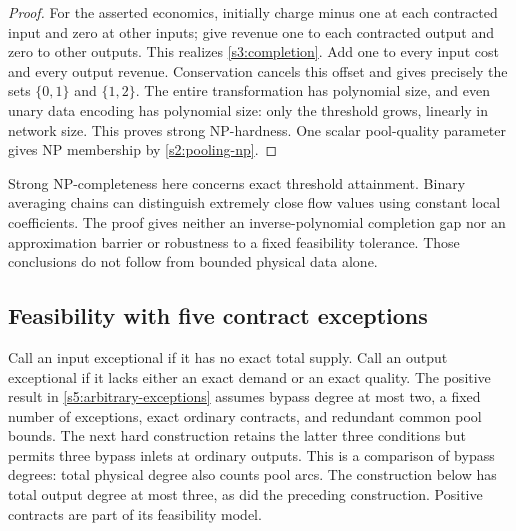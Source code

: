\begin{proof}
For the asserted economics, initially charge minus one at each contracted
input and zero at other inputs; give revenue one to each contracted
output and zero to other outputs. This realizes \eqref{s3:completion}.
Add one to every input cost and every output revenue. Conservation
cancels this offset and gives precisely the sets $\{0,1\}$ and
$\{1,2\}$. The entire transformation has polynomial size, and even
unary data encoding has polynomial size: only the threshold grows,
linearly in network size. This proves strong NP-hardness. One scalar
pool-quality parameter gives NP membership by \cref{s2:pooling-np}.
\end{proof}

Strong NP-completeness here concerns exact threshold attainment. Binary
averaging chains can distinguish extremely close flow values using
constant local coefficients. The proof gives neither an inverse-polynomial
completion gap nor an approximation barrier or robustness to a fixed
feasibility tolerance. Those conclusions do not follow from bounded
physical data alone.

\subsection{Feasibility with five contract exceptions}\label{s3:five}

Call an input exceptional if it has no exact total supply. Call an output
exceptional if it lacks either an exact demand or an exact quality.
The positive result in \cref{s5:arbitrary-exceptions} assumes bypass
degree at most two, a fixed number of exceptions, exact ordinary
contracts, and redundant common pool bounds. The next hard construction
retains the latter three conditions but permits three bypass inlets at
ordinary outputs. This is a comparison of bypass degrees: total physical
degree also counts pool arcs. The construction below has total output
degree at most three, as did the preceding construction. Positive
contracts are part of its feasibility model.

